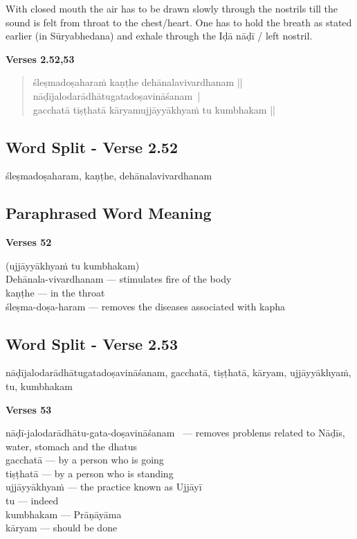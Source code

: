 With closed mouth the air has to be drawn slowly through the nostrils till the sound is felt from throat to the chest/heart. One has to hold the breath as stated earlier (in Sūryabhedana) and exhale through the Iḍā nāḍī / left nostril.    
\newpage


\noindent \textbf{Verses 2.52,53}

\begin{verse}
śleṣmadoṣaharaṁ kaṇṭhe dehānalavivardhanam ||\\
nāḍījalodarādhātugatadoṣavināśanam |\\
gacchatā tiṣṭhatā kāryamujjāyyākhyaṁ tu kumbhakam ||
\end{verse}

\subsection*{Word Split - Verse 2.52}

śleṣmadoṣaharam, kaṇṭhe, dehānalavivardhanam 

\subsection*{Paraphrased Word Meaning}

\noindent \textbf{Verses 52}

\begin{multicols}{2}
(ujjāyyākhyaṁ tu kumbhakam)\\
Dehānala-vivardhanam --- stimulates fire of the body \\
kaṇṭhe --- in the throat  \\
śleṣma-doṣa-haram --- removes the diseases associated with kapha 
\end{multicols}

\subsection*{Word Split - Verse 2.53}

nāḍījalodarādhātugatadoṣavināśanam, gacchatā, tiṣṭhatā, kāryam, ujjāyyākhyaṁ, tu, kumbhakam

\noindent \textbf{Verses 53}

\begin{multicols}{2}
nāḍī-jalodarādhātu-gata-doṣavi\-nāśanam  --- removes problems related to Nāḍīs, water, stomach and the dhatus\\
gacchatā --- by a person who is going \\
tiṣṭhatā --- by a person who is standing \\
ujjāyyākhyaṁ --- the practice known as Ujjāyī\\
tu --- indeed \\
kumbhakam --- Prāṇāyāma \\
kāryam --- should be done
\end{multicols}

